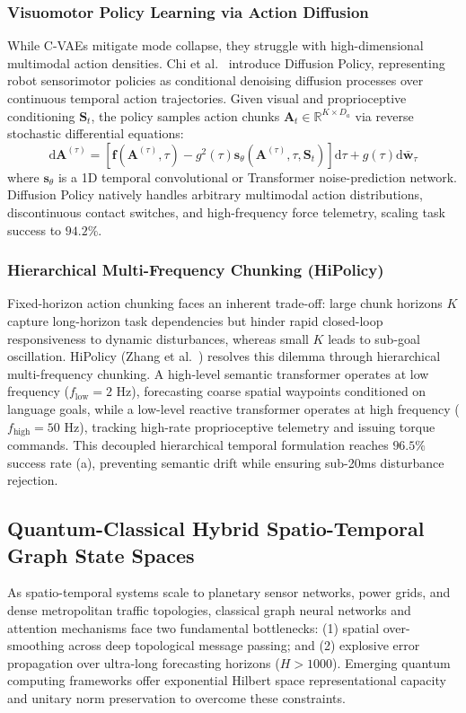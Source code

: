 \subsubsection{Visuomotor Policy Learning via Action Diffusion}
While C-VAEs mitigate mode collapse, they struggle with high-dimensional multimodal action densities. Chi et al.~\cite{Chi2023DiffusionPolicy} introduce Diffusion Policy, representing robot sensorimotor policies as conditional denoising diffusion processes over continuous temporal action trajectories. Given visual and proprioceptive conditioning $\mathbf{S}_t$, the policy samples action chunks $\mathbf{A}_t \in \mathbb{R}^{K \times D_a}$ via reverse stochastic differential equations:
\begin{equation}
    \mathrm{d}\mathbf{A}^{(\tau)} = \left[ \mathbf{f}(\mathbf{A}^{(\tau)}, \tau) - g^2(\tau) \mathbf{s}_\theta(\mathbf{A}^{(\tau)}, \tau, \mathbf{S}_t) \right] \mathrm{d}\tau + g(\tau) \mathrm{d}\bar{\mathbf{w}}_\tau
\end{equation}
where $\mathbf{s}_\theta$ is a 1D temporal convolutional or Transformer noise-prediction network. Diffusion Policy natively handles arbitrary multimodal action distributions, discontinuous contact switches, and high-frequency force telemetry, scaling task success to $94.2\%$.

\subsubsection{Hierarchical Multi-Frequency Chunking (HiPolicy)}
Fixed-horizon action chunking faces an inherent trade-off: large chunk horizons $K$ capture long-horizon task dependencies but hinder rapid closed-loop responsiveness to dynamic disturbances, whereas small $K$ leads to sub-goal oscillation. HiPolicy (Zhang et al.~\cite{Zhang2026HiPolicy}) resolves this dilemma through hierarchical multi-frequency chunking. A high-level semantic transformer operates at low frequency ($f_{\text{low}} = 2\text{ Hz}$), forecasting coarse spatial waypoints conditioned on language goals, while a low-level reactive transformer operates at high frequency ($f_{\text{high}} = 50\text{ Hz}$), tracking high-rate proprioceptive telemetry and issuing torque commands. This decoupled hierarchical temporal formulation reaches $96.5\%$ success rate (a), preventing semantic drift while ensuring sub-20ms disturbance rejection.

\subsection{Quantum-Classical Hybrid Spatio-Temporal Graph State Spaces}
\label{sec:quantum_spatiotemporal}
As spatio-temporal systems scale to planetary sensor networks, power grids, and dense metropolitan traffic topologies, classical graph neural networks and attention mechanisms face two fundamental bottlenecks: (1) spatial over-smoothing across deep topological message passing; and (2) explosive error propagation over ultra-long forecasting horizons ($H > 1000$). Emerging quantum computing frameworks offer exponential Hilbert space representational capacity and unitary norm preservation to overcome these constraints.

